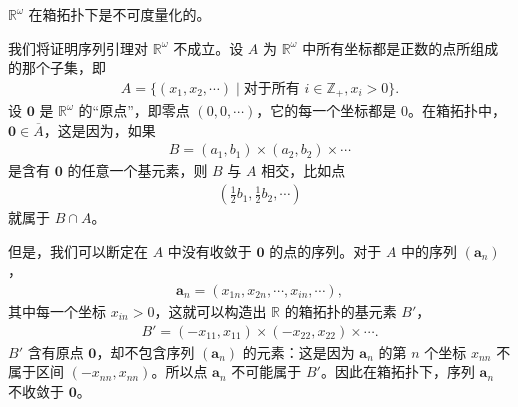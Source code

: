 \documentclass[../../main.tex]{subfiles}
\begin{document}
\begin{example}\label{example:ch02-Romega箱不可度量}
$\mathbb{R}^{\omega}$ 在箱拓扑下是不可度量化的。

我们将证明序列引理对 $\mathbb{R}^{\omega}$ 不成立。设 $A$ 为 $\mathbb{R}^{\omega}$ 中所有坐标都是正数的点所组成的那个子集，即
\begin{align*}
A = \{(x_{1}, x_{2}, \cdots) \mid \text{对于所有 } i \in \mathbb{Z}_{+}, x_{i} > 0\}.
\end{align*}
设 $\boldsymbol{0}$ 是 $\mathbb{R}^{\omega}$ 的“原点”，即零点 $(0, 0, \cdots)$，它的每一个坐标都是 0。在箱拓扑中，$\boldsymbol{0} \in \overline{A}$，这是因为，如果
\begin{align*}
B = (a_{1}, b_{1}) \times (a_{2}, b_{2}) \times \cdots
\end{align*}
是含有 $\boldsymbol{0}$ 的任意一个基元素，则 $B$ 与 $A$ 相交，比如点
\begin{align*}
\left(\frac{1}{2}b_{1}, \frac{1}{2}b_{2}, \cdots\right)
\end{align*}
就属于 $B \cap A$。

但是，我们可以断定在 $A$ 中没有收敛于 $\boldsymbol{0}$ 的点的序列。对于 $A$ 中的序列 $(\boldsymbol{a}_{n})$，
\begin{align*}
\boldsymbol{a}_{n} = (x_{1n}, x_{2n}, \cdots, x_{in}, \cdots),
\end{align*}
其中每一个坐标 $x_{in} > 0$，这就可以构造出 $\mathbb{R}$ 的箱拓扑的基元素 $B'$，
\begin{align*}
B' = (-x_{11}, x_{11}) \times (-x_{22}, x_{22}) \times \cdots.
\end{align*}
$B'$ 含有原点 $\boldsymbol{0}$，却不包含序列 $(\boldsymbol{a}_{n})$ 的元素：这是因为 $\boldsymbol{a}_{n}$ 的第 $n$ 个坐标 $x_{nn}$ 不属于区间 $(-x_{nn}, x_{nn})$。所以点 $\boldsymbol{a}_{n}$ 不可能属于 $B'$。因此在箱拓扑下，序列 $\boldsymbol{a}_{n}$ 不收敛于 $\boldsymbol{0}$。
\end{example}
\end{document}
